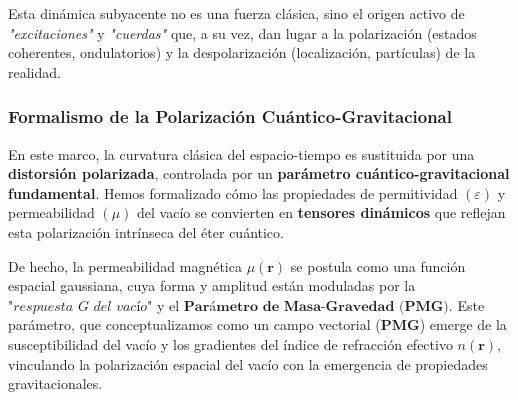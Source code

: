 \documentclass{article}
\begin{document}
Esta dinámica subyacente no es una fuerza clásica, sino el origen activo de \textit{"excitaciones"} y \textit{"cuerdas"} que, a su vez, dan lugar a la polarización (estados coherentes, ondulatorios) y la despolarización (localización, partículas) de la realidad.

\subsubsection{Formalismo de la Polarización Cuántico-Gravitacional}

En este marco, la curvatura clásica del espacio-tiempo es sustituida por una \textbf{distorsión polarizada}, controlada por un \textbf{parámetro cuántico-gravitacional fundamental}. Hemos formalizado cómo las propiedades de 
permitividad 
$(ε)$
y permeabilidad 
$(μ)$
del vacío se convierten en \textbf{tensores dinámicos} que reflejan esta polarización intrínseca del éter cuántico.

De hecho, la permeabilidad magnética
$μ(\textbf{r})$ 
se postula como una función espacial gaussiana, cuya forma y amplitud están moduladas por la
$\textit{"respuesta G del vacío"}$
y el 
$\textbf{Parámetro de Masa-Gravedad (PMG)}$. 
Este parámetro, que conceptualizamos como un campo vectorial (\textbf{PMG}) emerge de la susceptibilidad del vacío y los gradientes del índice de refracción efectivo $n(\textbf{r})$, vinculando la polarización espacial del vacío con la emergencia de propiedades gravitacionales.
\end{document}
